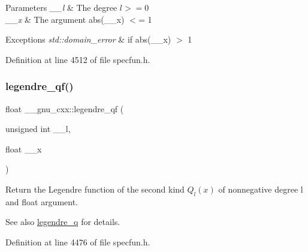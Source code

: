 \begin{DoxyParams}{Parameters}
{\em \+\_\+\+\_\+l} & The degree $ l >= 0 $ \\
\hline
{\em \+\_\+\+\_\+x} & The argument {\ttfamily abs(\+\_\+\+\_\+x)} $<$= 1 \\
\hline
\end{DoxyParams}

\begin{DoxyExceptions}{Exceptions}
{\em std\+::domain\+\_\+error} & if {\ttfamily abs(\+\_\+\+\_\+x)} $>$ 1 \\
\hline
\end{DoxyExceptions}


Definition at line 4512 of file specfun.\+h.

\mbox{\label{group__mathsf__gnu_ga46cf4d58886af402c6776bc090b4e4a7}} 
\subsubsection{\texorpdfstring{legendre\+\_\+qf()}{legendre\_qf()}}
{\footnotesize\ttfamily float \+\_\+\+\_\+gnu\+\_\+cxx\+::legendre\+\_\+qf (\begin{DoxyParamCaption}\item[{unsigned int}]{\+\_\+\+\_\+l,  }\item[{float}]{\+\_\+\+\_\+x }\end{DoxyParamCaption})\hspace{0.3cm}{\ttfamily [inline]}}

Return the Legendre function of the second kind $ Q_l(x) $ of nonnegative degree {\ttfamily l} and {\ttfamily float} argument.

\begin{DoxySeeAlso}{See also}
\hyperlink{group__mathsf__gnu_gadad5b22d0075dca31690907668af568f}{legendre\+\_\+q} for details. 
\end{DoxySeeAlso}


Definition at line 4476 of file specfun.\+h.

\mbox{\label{group__mathsf__gnu_ga60feac5a8bd733abee6610adf15208f2}} 
